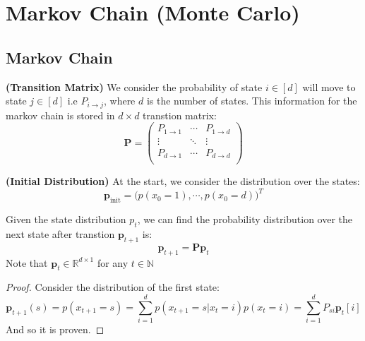 \section{Markov Chain (Monte Carlo)}

\subsection{Markov Chain}

\begin{definition}{\textbf{(Transition Matrix)}}
    We consider the probability of state $i \in [d]$ will move to state $j \in [d]$ i.e $P_{i\rightarrow j}$, where $d$ is the number of states. This information for the markov chain is stored in $d\times d$ transtion matrix:
    \begin{equation*}
        \boldsymbol P = \begin{pmatrix}
            P_{1 \rightarrow 1} & \cdots & P_{1 \rightarrow d} \\
            \vdots & \ddots & \vdots \\
            P_{d \rightarrow 1} & \cdots & P_{d \rightarrow d} \\
        \end{pmatrix}
    \end{equation*}
\end{definition}

\begin{definition}{\textbf{(Initial Distribution)}}
    At the start, we consider the distribution over the states:
    \begin{equation*}
        \boldsymbol p_\text{init} = \Big(p(x_0 = 1), \cdots, p(x_0=d)\Big)^T
    \end{equation*}
\end{definition}

\begin{lemma}
    Given the state distribution $p_t$, we can find the probability distribution over the next state after transtion $\boldsymbol p_{t+1}$ is:
    \begin{equation*}
        \boldsymbol p_{t+1} =  \boldsymbol P\boldsymbol p_t
    \end{equation*}
    Note that $ \boldsymbol p_t \in \mathbb{R}^{d \times 1}$ for any $t\in \mathbb{N}$
\end{lemma}
\begin{proof}
    Consider the distribution of the first state:
    \begin{equation*}
        \boldsymbol p_{t+1}(s) = p(x_{t+1} = s) = \sum^d_{i=1}p(x_{t+1} = s | x_t = i)p(x_t = i) = \sum^d_{i=1}P_{si}\boldsymbol p_{t}[i]
    \end{equation*}
    And so it is proven. 
\end{proof}

